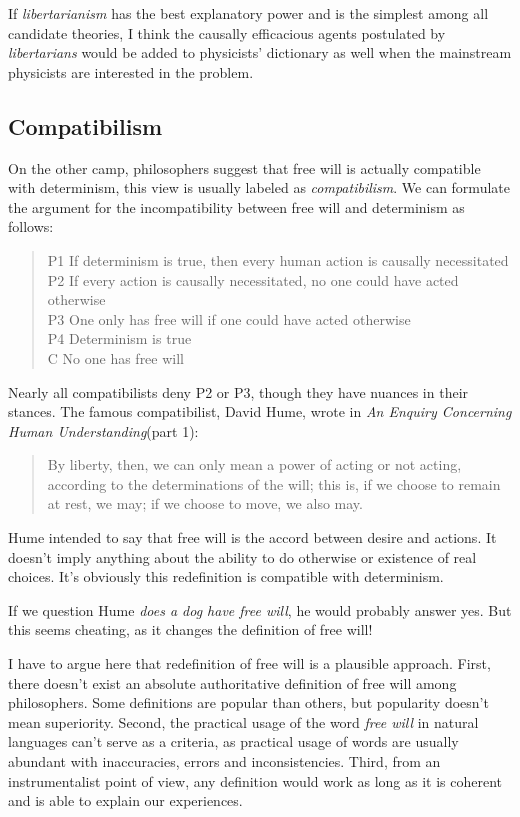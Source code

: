 If \emph{libertarianism} has the best explanatory power and is the simplest among all candidate theories, I think the causally efficacious agents postulated by \emph{libertarians} would be added to physicists' dictionary as well when the mainstream physicists are interested in the problem.

\subsection{Compatibilism}

On the other camp, philosophers suggest that free will is actually compatible with determinism, this view is usually labeled as \emph{compatibilism}\cite{sep-compatibilism}. We can formulate the argument for the incompatibility between free will and determinism as follows:

\begin{quote}
P1 If determinism is true, then every human action is causally necessitated \\
P2 If every action is causally necessitated, no one could have acted otherwise \\
P3 One only has free will if one could have acted otherwise \\
P4 Determinism is true \\
C No one has free will
\end{quote}

Nearly all compatibilists deny P2 or P3, though they have nuances in their stances. The famous compatibilist, David Hume, wrote in \emph{An Enquiry Concerning Human Understanding}(part 1):

\begin{quote}
By liberty, then, we can only mean a power of acting or not acting, according to the determinations of the will; this is, if we choose to remain at rest, we may; if we choose to move, we also may.
\end{quote}

Hume intended to say that free will is the accord between desire and actions. It doesn't imply anything about the ability to do otherwise or existence of real choices. It's obviously this redefinition is compatible with determinism.

If we question Hume \emph{does a dog have free will}, he would probably answer yes. But this seems cheating, as it changes the definition of free will!

I have to argue here that redefinition of free will is a plausible approach. First, there doesn't exist an absolute authoritative definition of free will among philosophers. Some definitions are popular than others, but popularity doesn't mean superiority. Second, the practical usage of the word \emph{free will} in natural languages can't serve as a criteria, as practical usage of words are usually abundant with inaccuracies,  errors and inconsistencies. Third, from an instrumentalist point of view, any definition would work as long as it is coherent and is able to explain our experiences.

